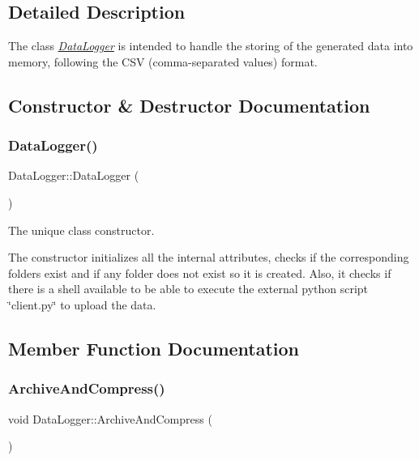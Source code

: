 \subsection{Detailed Description}
The class {\itshape \hyperlink{classDataLogger}{Data\+Logger}} is intended to handle the storing of the generated data into memory, following the C\+SV (comma-\/separated values) format. 

\subsection{Constructor \& Destructor Documentation}
\mbox{\label{classDataLogger_a7abebacd4747644d22982f9676466bad}} 
\subsubsection{\texorpdfstring{Data\+Logger()}{DataLogger()}}
{\footnotesize\ttfamily Data\+Logger\+::\+Data\+Logger (\begin{DoxyParamCaption}{ }\end{DoxyParamCaption})}



The unique class constructor. 

The constructor initializes all the internal attributes, checks if the corresponding folders exist and if any folder does not exist so it is created. Also, it checks if there is a shell available to be able to execute the external python script \char`\"{}client.\+py\char`\"{} to upload the data. 

\subsection{Member Function Documentation}
\mbox{\label{classDataLogger_a147fb7eaee1c38bbf57ef2d6cddf70d5}} 
\subsubsection{\texorpdfstring{Archive\+And\+Compress()}{ArchiveAndCompress()}}
{\footnotesize\ttfamily void Data\+Logger\+::\+Archive\+And\+Compress (\begin{DoxyParamCaption}{ }\end{DoxyParamCaption})}



